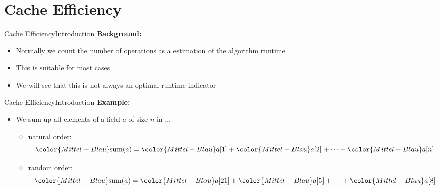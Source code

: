 \section{Cache Efficiency}


\begin{frame}{Cache Efficiency}{Introduction}
  \textbf{Background:}
  \begin{itemize}
    \item
      Normally we count the {\color{Mittel-Blau}number of operations} as a
      estimation of the algorithm runtime
    \item
      This is suitable for most cases
    \item
      We will see that this is not always an optimal runtime indicator
  \end{itemize}
\end{frame}


\begin{frame}{Cache Efficiency}{Introduction}
  \textbf{Example:}
  \begin{itemize}
    \item
      We sum up all elements of a field {\color{Mittel-Blau}$a$} of size
      {\color{Mittel-Blau}$n$} in $\ldots$
    \begin{itemize}
      \item
        natural order:
        \begin{displaymath}
          {\color{Mittel-Blau}\mathrm{sum}(a)} =
          {\color{Mittel-Blau}a[1]} +
          {\color{Mittel-Blau}a[2]} +
          \dots +
          {\color{Mittel-Blau}a[n]}
        \end{displaymath}
      \item
        random order:
        \begin{displaymath}
          {\color{Mittel-Blau}\mathrm{sum}(a)} =
          {\color{Mittel-Blau}a[21]} +
          {\color{Mittel-Blau}a[5]} +
          \dots +
          {\color{Mittel-Blau}a[8]}
        \end{displaymath}
    \end{itemize}
  \end{itemize}
\end{frame}


